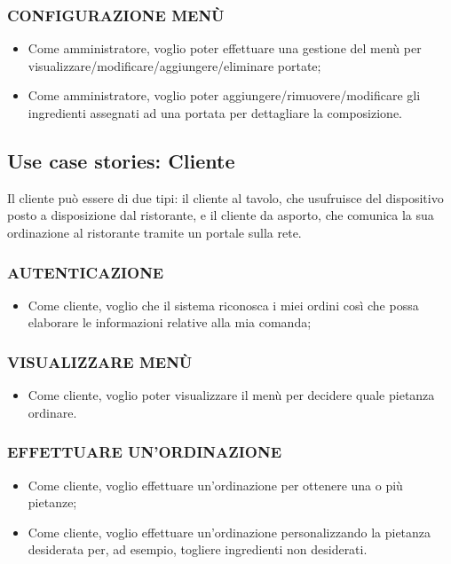 \subsubsection{CONFIGURAZIONE MENÙ} 
\begin{itemize}
	\item Come amministratore, voglio poter effettuare una gestione del menù per visualizzare/modificare/aggiungere/eliminare portate;  
	\item Come amministratore, voglio poter aggiungere/rimuovere/modificare gli ingredienti assegnati ad una portata per dettagliare la composizione.
\end{itemize}


\subsection{Use case stories: Cliente}
Il cliente può essere di due tipi: il cliente al tavolo, che usufruisce del dispositivo posto a disposizione dal ristorante, e il cliente da asporto, che comunica la sua ordinazione al ristorante tramite un portale sulla rete.

\subsubsection{AUTENTICAZIONE} 
\begin{itemize}
	\item Come cliente, voglio che il sistema riconosca i miei ordini così che possa elaborare le informazioni relative alla mia comanda;
\end{itemize}

\subsubsection{VISUALIZZARE MENÙ} 
\begin{itemize}
	\item Come cliente, voglio poter visualizzare il menù per decidere quale pietanza ordinare.
\end{itemize}

\subsubsection{EFFETTUARE UN'ORDINAZIONE} 
\begin{itemize}
	\item Come cliente, voglio effettuare un’ordinazione per ottenere una o più pietanze; 
	\item Come cliente, voglio effettuare un’ordinazione personalizzando la pietanza desiderata per, ad esempio, togliere ingredienti non desiderati.
\end{itemize}

